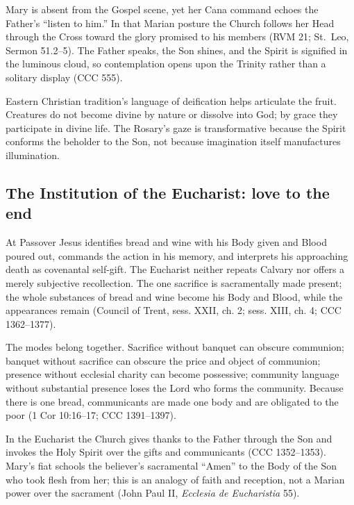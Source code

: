 Mary is absent from the Gospel scene, yet her Cana command echoes the Father's ``listen to him.'' In that Marian posture the Church follows her Head through the Cross toward the glory promised to his members (RVM 21; St.~Leo, Sermon 51.2--5). The Father speaks, the Son shines, and the Spirit is signified in the luminous cloud, so contemplation opens upon the Trinity rather than a solitary display (CCC 555).

Eastern Christian tradition's language of deification helps articulate the fruit. Creatures do not become divine by nature or dissolve into God; by grace they participate in divine life. The Rosary's gaze is transformative because the Spirit conforms the beholder to the Son, not because imagination itself manufactures illumination.

\subsection{The Institution of the Eucharist: love to the end}


At Passover Jesus identifies bread and wine with his Body given and Blood poured out, commands the action in his memory, and interprets his approaching death as covenantal self-gift. The Eucharist neither repeats Calvary nor offers a merely subjective recollection. The one sacrifice is sacramentally made present; the whole substances of bread and wine become his Body and Blood, while the appearances remain (Council of Trent, sess. XXII, ch. 2; sess. XIII, ch. 4; CCC 1362--1377).

The modes belong together. Sacrifice without banquet can obscure communion; banquet without sacrifice can obscure the price and object of communion; presence without ecclesial charity can become possessive; community language without substantial presence loses the Lord who forms the community. Because there is one bread, communicants are made one body and are obligated to the poor (1 Cor 10:16--17; CCC 1391--1397).

In the Eucharist the Church gives thanks to the Father through the Son and invokes the Holy Spirit over the gifts and communicants (CCC 1352--1353). Mary's fiat schools the believer's sacramental ``Amen'' to the Body of the Son who took flesh from her; this is an analogy of faith and reception, not a Marian power over the sacrament (John Paul II, \emph{Ecclesia de Eucharistia} 55).

